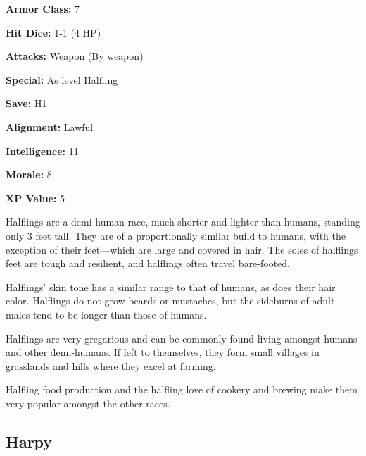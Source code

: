 \begin{multicols*}{2}
{\textbf{Armor Class:} 7

\textbf{Hit Dice:} 1-1 (4 HP)

\textbf{Attacks:} Weapon (By weapon)

\textbf{Special:} As  level Halfling

\textbf{Save:} H1

\textbf{Alignment:} Lawful

\textbf{Intelligence:} 11

\textbf{Morale:} 8

\textbf{XP Value:} 5}

Halflings are a demi-human race, much shorter and lighter than humans, standing only 3 feet tall. They are of a proportionally similar build to humans, with the exception of their feet—which are large and covered in hair. The soles of halflings feet are tough and resilient, and halflings often travel bare-footed.

Halflings’ skin tone has a similar range to that of humans, as does their hair color. Halflings do not grow beards or mustaches, but the sideburns of adult males tend to be longer than those of humans.

Halflings are very gregarious and can be commonly found living amongst humans and other demi-humans. If left to themselves, they form small villages in grasslands and hills where they excel at farming.

Halfling food production and the halfling love of cookery and brewing make them very popular amongst the other races.

\subsection{Harpy}
\end{multicols*}
